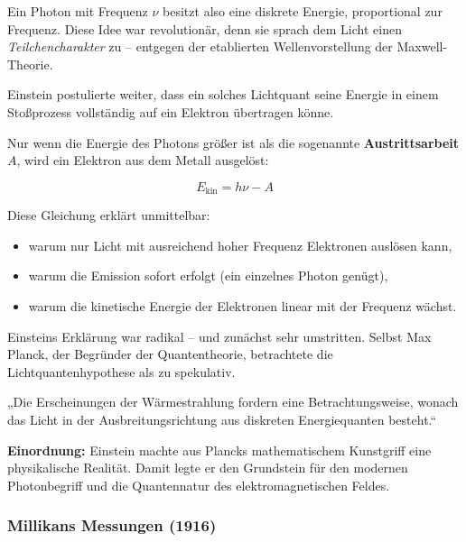 Ein Photon mit Frequenz \( \nu \) besitzt also eine diskrete Energie, proportional zur Frequenz. Diese Idee war revolutionär, denn sie sprach dem Licht einen \emph{Teilchencharakter} zu – entgegen der etablierten Wellenvorstellung der Maxwell-Theorie.

Einstein postulierte weiter, dass ein solches Lichtquant seine Energie in einem Stoßprozess vollständig auf ein Elektron übertragen könne. 

Nur wenn die Energie des Photons größer ist als die sogenannte \textbf{Austrittsarbeit} \( A \), wird ein Elektron aus dem Metall ausgelöst:

\[
E_{\text{kin}} = h \nu - A
\]

Diese Gleichung erklärt unmittelbar:
\begin{itemize}
	\item warum nur Licht mit ausreichend hoher Frequenz Elektronen auslösen kann,
	\item warum die Emission sofort erfolgt (ein einzelnes Photon genügt),
	\item warum die kinetische Energie der Elektronen linear mit der Frequenz wächst.
\end{itemize}

Einsteins Erklärung war radikal – und zunächst sehr umstritten. Selbst Max Planck, der Begründer der Quantentheorie, betrachtete die Lichtquantenhypothese als zu spekulativ.

\vspace{1em}
\begin{tcolorbox}[physikbox, title=Albert Einstein (1905)\textit{ \cite{einstein1905}} ]
	\label{die Erscheinung der Wärm}
	\small
	„Die Erscheinungen der Wärmestrahlung fordern eine Betrachtungsweise, wonach das Licht in der Ausbreitungsrichtung aus diskreten Energiequanten besteht.“
\end{tcolorbox}
\vspace{1em}
\textbf{Einordnung:} Einstein machte aus Plancks mathematischem Kunstgriff eine physikalische Realität. Damit legte er den Grundstein für den modernen Photonbegriff und die Quantennatur des elektromagnetischen Feldes.

\subsubsection{Millikans Messungen (1916)}


